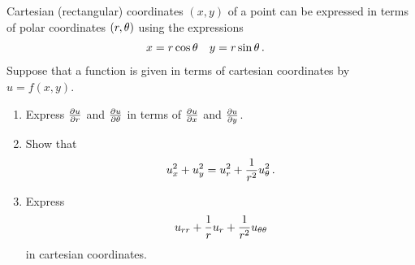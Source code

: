 \begin{question}
Cartesian (rectangular) coordinates $(x,y)$ of a point can be expressed in terms of polar coordinates $(r,\theta)$ using the expressions
\begin{align*}
x &= r \cos \theta &
y &= r \sin \theta\,.
\end{align*}
Suppose that a function is given in terms of cartesian coordinates by $u=f(x,y)$. 
\begin{enumerate}
\item
Express $\frac{\partial u}{\partial r}$ and $\frac{\partial u}{\partial \theta}$ in terms of
$\frac{\partial u}{\partial x}$ and $\frac{\partial u}{\partial y}$.
\item
Show that
\[
u_x^2 + u_y^2 = u_r^2 + \frac 1{r^2} u_\theta^2\,.
\]
\item
Express
\[
u_{rr} + \frac 1r u_r + \frac 1{r^2} u_{\theta\theta}
\]
in cartesian coordinates.
\end{enumerate}
\end{question}

